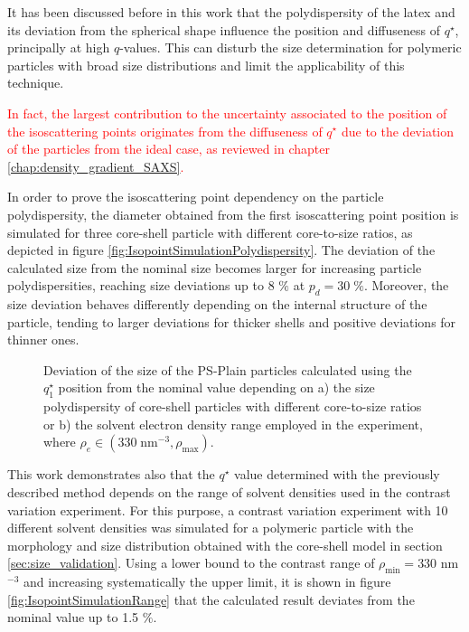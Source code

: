 It has been discussed before in this work that the polydispersity of the latex and its deviation from the spherical shape influence the position and diffuseness of $q^{\star}$, principally at high $q$-values. This can disturb the size determination for polymeric particles with broad size distributions and limit the applicability of this technique. 



\textcolor{red}{In fact, the largest contribution to the uncertainty associated to the position of the isoscattering points originates from the diffuseness of $q^{\star}$ due to the deviation of the particles from the ideal case, as reviewed in chapter \ref{chap:density_gradient_SAXS}.}




In order to prove the isoscattering point dependency on the particle polydispersity, the diameter obtained from the first isoscattering point position is simulated for three core-shell particle with different core-to-size ratios, as depicted in figure \ref{fig:IsopointSimulationPolydispersity}. The deviation of the calculated size from the nominal size becomes larger for increasing particle polydispersities, reaching size deviations up to 8 $\%$ at $p_d = 30\;\%$. Moreover, the size deviation behaves differently depending on the internal structure of the particle, tending to larger deviations for thicker shells and positive deviations for thinner ones.

\begin{figure*}%
	\centering
		\qquad
	\caption[Deviation of the size of the PS-Plain particles obtained with $q_1^{\star}$ from the nominal value.]{Deviation of the size of the PS-Plain particles calculated using the $q_1^{\star}$ position from the nominal value depending on a) the size polydispersity of core-shell particles with different core-to-size ratios or b) the solvent electron density range employed in the experiment, where  $\rho_e \in (330\;\mbox{nm}^{-3}, \rho_{\text{max}})$.}

\end{figure*}

This work demonstrates also that the $q^{\star}$ value determined with the previously described method depends on the range of solvent densities used in the contrast variation experiment. For this purpose,  a contrast variation experiment with 10 different solvent densities was simulated for a polymeric particle with the morphology and size distribution obtained with the core-shell model in section \ref{sec:size_validation}. Using a lower bound to the contrast range of $\rho_{\text{min}}=330$ nm$^{-3}$ and increasing systematically the upper limit, it is shown in figure \ref{fig:IsopointSimulationRange} that the calculated result deviates from the nominal value up to 1.5 $\%$. 

